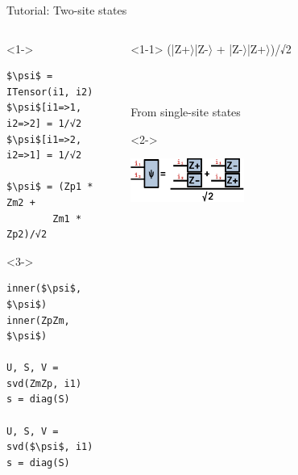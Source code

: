 \begin{frame}[fragile]{Tutorial: Two-site states}

\begin{columns}

\begin{column}{5cm}

\begin{onlyenv}<1->
\begin{lstlisting}[language=JuliaLocal, style=julia, basicstyle=\small]
$\psi$ = ITensor(i1, i2)
$\psi$[i1=>1, i2=>2] = 1/√2
$\psi$[i1=>2, i2=>1] = 1/√2

$\psi$ = (Zp1 * Zm2 +
        Zm1 * Zp2)/√2
\end{lstlisting}
\end{onlyenv}

\begin{onlyenv}<3->
\begin{lstlisting}[language=JuliaLocal, style=julia, basicstyle=\small]
inner($\psi$, $\psi$)
inner(ZpZm, $\psi$)

U, S, V = svd(ZmZp, i1)
s = diag(S)

U, S, V = svd($\psi$, i1)
s = diag(S)
\end{lstlisting}
\end{onlyenv}

\end{column}

\begin{column}{5cm}

\begin{onlyenv}<1-1>
(|Z+$\rangle$|Z-$\rangle$ + |Z-$\rangle$|Z+$\rangle$)/√2 \\
~\\
~\\
~\\
From single-site states \\
\end{onlyenv}

\begin{onlyenv}<2->
\vspace*{0.0cm}
\begin{center}
\includegraphics[width=0.2\textwidth]{
  slides/assets/cat12.png
}
\end{center}
\vspace*{0.0cm}
\end{onlyenv}


\end{column}
\end{columns}
\end{frame}
